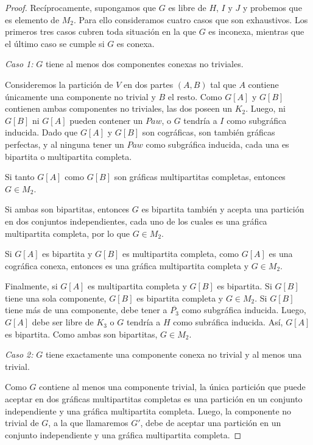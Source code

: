 \begin{proof}
    Recíprocamente, supongamos que $G$ es libre de $H$, $I$ y $J$ y probemos
    que es elemento de $M_2$. Para ello consideramos
    cuatro casos que son exhaustivos. Los primeros tres casos cubren toda
    situación en la que $G$ es inconexa, mientras que el último caso se cumple
    si $G$ es conexa.

    \emph{Caso 1:} $G$ tiene al menos dos componentes conexas no triviales.

    Consideremos la partición de $V$ en dos partes $(A,B)$ tal que $A$ contiene
    únicamente una componente no trivial y $B$ el resto. Como $G[A]$ y $G[B]$
    contienen ambas componentes no triviales, las dos poseen un $K_2$. Luego, ni $G[B]$ ni $G[A]$ pueden contener un $Paw$, o $G$ tendría a $I$ como
    subgráfica inducida. Dado que $G[A]$ y $G[B]$ son cográficas, son también
    gráficas perfectas, y al ninguna tener un $Paw$ como subgráfica inducida,
    cada una es bipartita o multipartita completa\cite{Olariu}. 
    
    Si tanto $G[A]$ como $G[B]$ son gráficas multipartitas completas, entonces $G \in M_2$.

    Si ambas son bipartitas, entonces $G$ es bipartita también y acepta una partición en dos conjuntos independientes, cada uno de los cuales es una gráfica multipartita completa, por lo que $G \in M_2$.

    Si $G[A]$ es bipartita y $G[B]$ es multipartita completa, como $G[A]$ es una cográfica conexa, entonces es una gráfica multipartita completa y $G \in M_2$.

    Finalmente, si $G[A]$ es multipartita completa y $G[B]$ es bipartita. Si
    $G[B]$ tiene una sola componente, $G[B]$ es bipartita completa y $G \in
    M_2$. Si $G[B]$ tiene más de una componente, debe tener a $\overline{P_3}$
    como subgráfica inducida. Luego, $G[A]$ debe ser libre de $K_3$ o $G$
    tendría a $H$ como subráfica inducida. Así, $G[A]$ es bipartita. Como ambas
    son bipartitas, $G \in M_2$.
    

    \emph{Caso 2:} $G$ tiene exactamente una componente conexa no trivial y al menos una trivial.

    Como $G$ contiene al menos una componente trivial, la única partición que puede aceptar en dos gráficas multipartitas completas es una partición en un conjunto independiente y una gráfica multipartita completa. Luego, la componente no trivial de $G$, a la que llamaremos $G'$, debe de aceptar una partición en un conjunto independiente y una gráfica multipartita completa.


\end{proof}
